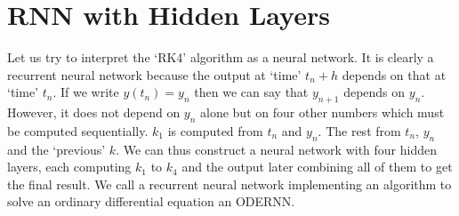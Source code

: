 \documentclass{article}
\numberwithin{equation}{section}
\begin{document}
\section{RNN with Hidden Layers}\label{s7}
Let us try to interpret the `RK4' algorithm as a neural network. It is 
clearly a recurrent neural network because the output at `time' $t_n + h$
depends on that at `time' $t_n$. If we write $y(t_n) = y_n$ then we can
say that $y_{n+1}$ depends on $y_n$. However, it does not depend on $y_n$
alone but on four other numbers which must be computed sequentially. $k_1$
is computed from $t_n$ and $y_n$. The rest from $t_n$, $y_n$ and the 
`previous' $k$. We can thus construct a neural network with four hidden 
layers, each computing $k_1$ to $k_4$ and the output later combining
all of them to get the final result. We call a recurrent neural network
implementing an algorithm to solve an ordinary differential equation an
ODERNN.
\end{document}
